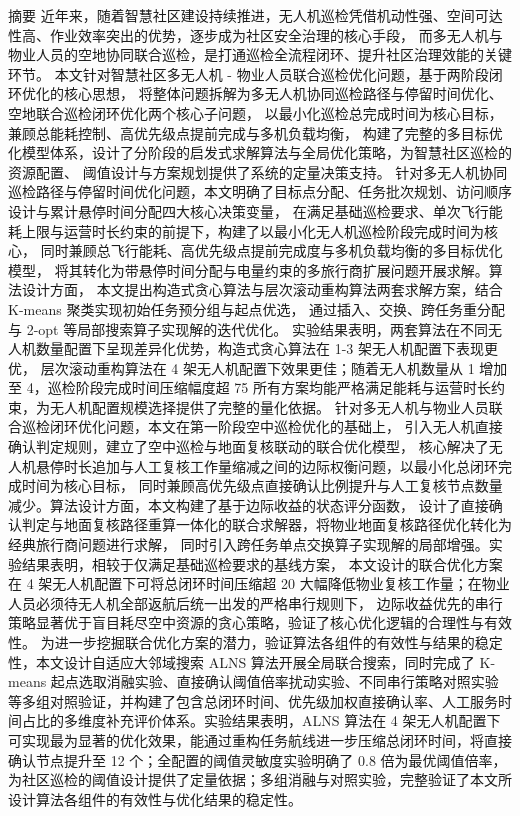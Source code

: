 摘要
近年来，随着智慧社区建设持续推进，无人机巡检凭借机动性强、空间可达性高、作业效率突出的优势，逐步成为社区安全治理的核心手段，
而多无人机与物业人员的空地协同联合巡检，是打通巡检全流程闭环、提升社区治理效能的关键环节。
本文针对智慧社区多无人机 - 物业人员联合巡检优化问题，基于两阶段闭环优化的核心思想，
将整体问题拆解为多无人机协同巡检路径与停留时间优化、空地联合巡检闭环优化两个核心子问题，
以最小化巡检总完成时间为核心目标，兼顾总能耗控制、高优先级点提前完成与多机负载均衡，
构建了完整的多目标优化模型体系，设计了分阶段的启发式求解算法与全局优化策略，为智慧社区巡检的资源配置、
阈值设计与方案规划提供了系统的定量决策支持。
针对多无人机协同巡检路径与停留时间优化问题，本文明确了目标点分配、任务批次规划、访问顺序设计与累计悬停时间分配四大核心决策变量，
在满足基础巡检要求、单次飞行能耗上限与运营时长约束的前提下，构建了以最小化无人机巡检阶段完成时间为核心，
同时兼顾总飞行能耗、高优先级点提前完成度与多机负载均衡的多目标优化模型，
将其转化为带悬停时间分配与电量约束的多旅行商扩展问题开展求解。算法设计方面，
本文提出构造式贪心算法与层次滚动重构算法两套求解方案，结合 K-means 聚类实现初始任务预分组与起点优选，
通过插入、交换、跨任务重分配与 2-opt 等局部搜索算子实现解的迭代优化。
实验结果表明，两套算法在不同无人机数量配置下呈现差异化优势，构造式贪心算法在 1-3 架无人机配置下表现更优，
层次滚动重构算法在 4 架无人机配置下效果更佳；随着无人机数量从 1 增加至 4，巡检阶段完成时间压缩幅度超 75%
所有方案均能严格满足能耗与运营时长约束，为无人机配置规模选择提供了完整的量化依据。
针对多无人机与物业人员联合巡检闭环优化问题，本文在第一阶段空中巡检优化的基础上，
引入无人机直接确认判定规则，建立了空中巡检与地面复核联动的联合优化模型，
核心解决了无人机悬停时长追加与人工复核工作量缩减之间的边际权衡问题，以最小化总闭环完成时间为核心目标，
同时兼顾高优先级点直接确认比例提升与人工复核节点数量减少。算法设计方面，本文构建了基于边际收益的状态评分函数，
设计了直接确认判定与地面复核路径重算一体化的联合求解器，将物业地面复核路径优化转化为经典旅行商问题进行求解，
同时引入跨任务单点交换算子实现解的局部增强。实验结果表明，相较于仅满足基础巡检要求的基线方案，
本文设计的联合优化方案在 4 架无人机配置下可将总闭环时间压缩超 20%
大幅降低物业复核工作量；在物业人员必须待无人机全部返航后统一出发的严格串行规则下，
边际收益优先的串行策略显著优于盲目耗尽空中资源的贪心策略，验证了核心优化逻辑的合理性与有效性。
为进一步挖掘联合优化方案的潜力，验证算法各组件的有效性与结果的稳定性，本文设计自适应大邻域搜索 ALNS 算法开展全局联合搜索，同时完成了 K-means 起点选取消融实验、直接确认阈值倍率扰动实验、不同串行策略对照实验等多组对照验证，并构建了包含总闭环时间、优先级加权直接确认率、人工服务时间占比的多维度补充评价体系。实验结果表明，ALNS 算法在 4 架无人机配置下可实现最为显著的优化效果，能通过重构任务航线进一步压缩总闭环时间，将直接确认节点提升至 12 个；全配置的阈值灵敏度实验明确了 0.8 倍为最优阈值倍率，为社区巡检的阈值设计提供了定量依据；多组消融与对照实验，完整验证了本文所设计算法各组件的有效性与优化结果的稳定性。
